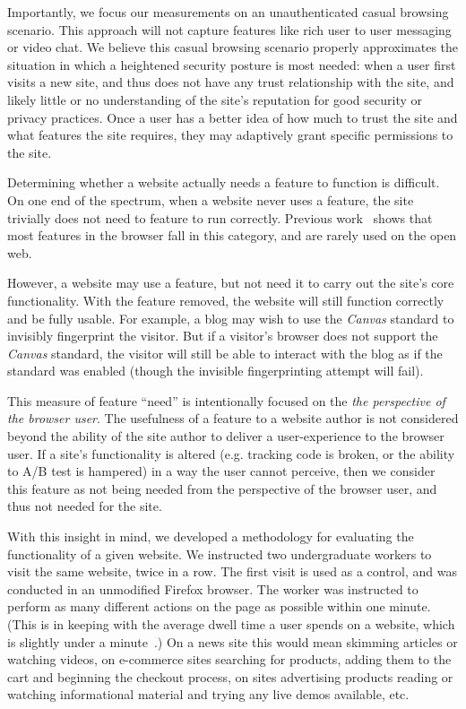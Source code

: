 Importantly, we focus our measurements on an unauthenticated casual browsing
scenario. This approach will not capture features like rich user to user
messaging or video chat. We believe this casual browsing scenario properly
approximates the situation in which a heightened security posture is most
needed: when a user first visits a new site, and thus does not have any trust
relationship with the site, and likely little or no understanding of the site's
reputation for good security or privacy practices.  Once a user has a better idea
of how much to trust the site and what features the site requires, they may adaptively
grant specific permissions to the site.

Determining whether a website actually needs a feature to function is difficult.
On one end of the spectrum, when a website never uses a feature, the
site trivially does not need to feature to run correctly.  Previous
work~\cite{snyder2016browser} shows that most features in the browser
fall in this category, and are rarely used on the open web.

However, a website may use a feature, but not need it
to carry out the site's core functionality.  With the feature removed, the website will
still function correctly and be fully usable.  For example, a blog may wish to use
the \textit{Canvas} standard to invisibly fingerprint the visitor.  But if a visitor's
browser does not support the \textit{Canvas} standard, the visitor will still be able
to interact with the blog as if the standard was enabled (though the invisible
fingerprinting attempt will fail).

This measure of feature ``need'' is intentionally focused on the \emph{the
perspective of the browser user}.  The usefulness of a feature to a website
author is not considered beyond the ability of the
site author to deliver a user-experience to the browser user. If a site's functionality
is altered (e.g. tracking code is broken, or the ability to A/B test is hampered)
in a way the user cannot perceive, then we consider this feature as not being
needed from the perspective of the browser user, and thus not needed for the site.

With this insight in mind, we developed a methodology for evaluating the
functionality of a given website. We instructed two
undergraduate workers to visit the same website, twice in a row. The first visit
is used as a control, and was conducted in an unmodified Firefox browser.
The worker was instructed to perform as many different actions on the page as
possible within one minute. (This is in keeping with the average dwell time a
user spends on a website, which is slightly under a minute~\cite{liu2010understanding}.)
On a news site this would mean skimming articles
or watching videos, on e-commerce sites searching for products,
adding them to the cart and beginning the checkout process, on sites
advertising products reading or watching informational material and trying any live demos
available, etc.

